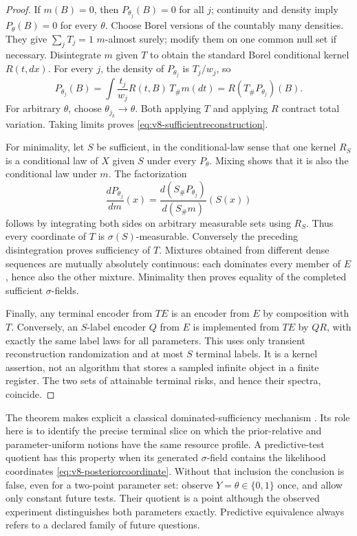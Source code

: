 \begin{proof}
If $m(B)=0$, then $P_{\theta_j}(B)=0$ for all $j$; continuity and density
imply $P_\theta(B)=0$ for every $\theta$. Choose Borel versions of the
countably many densities. They give $\sum_jT_j=1$ $m$-almost surely;
modify them on one common null set if necessary. Disintegrate $m$ given
$T$ to obtain the standard Borel conditional kernel $R(t,dx)$.
For every $j$, the density of $P_{\theta_j}$ is $T_j/w_j$, so
\[
 P_{\theta_j}(B)=\int \frac{t_j}{w_j}R(t,B)\,T_\#m(dt)
               =R(T_\#P_{\theta_j})(B).
\]
For arbitrary $\theta$, choose $\theta_{j_k}\to\theta$. Both applying
$T$ and applying $R$ contract total variation. Taking limits proves
\eqref{eq:v8-sufficientreconstruction}.

For minimality, let $S$ be sufficient, in the conditional-law sense that
one kernel $R_S$ is a conditional law of $X$ given $S$ under every
$P_\theta$. Mixing shows that it is also the conditional law under $m$.
The factorization
\[
 \frac{dP_{\theta_j}}{dm}(x)
 =\frac{d(S_\#P_{\theta_j})}{d(S_\#m)}(S(x))
\]
follows by integrating both sides on arbitrary measurable sets using
$R_S$. Thus every coordinate of $T$ is $\sigma(S)$-measurable.
Conversely the preceding disintegration proves sufficiency of $T$.
Mixtures obtained from different dense sequences are mutually absolutely
continuous: each dominates every member of $E$, hence also the other
mixture. Minimality then proves equality of the completed sufficient
$\sigma$-fields.

Finally, any terminal encoder from $TE$ is an encoder from $E$ by
composition with $T$. Conversely, an $S$-label encoder $Q$ from $E$ is
implemented from $TE$ by $QR$, with exactly the same label laws for all
parameters. This uses only transient reconstruction randomization and
at most $S$ terminal labels. It is a kernel assertion, not an algorithm
that stores a sampled infinite object in a finite register. The two
sets of attainable terminal risks, and hence their spectra, coincide.
\end{proof}

The theorem makes explicit a classical dominated-sufficiency mechanism
\cite{LeCam1964,Torgersen1991}. Its role here is to identify the precise
terminal slice on which the prior-relative and parameter-uniform notions
have the same resource profile. A predictive-test quotient has this
property when its generated $\sigma$-field contains the likelihood
coordinates \eqref{eq:v8-posteriorcoordinate}. Without that inclusion the
conclusion is false, even for a two-point parameter set: observe
$Y=\theta\in\{0,1\}$ once, and allow only constant future tests. Their
quotient is a point although the observed experiment distinguishes both
parameters exactly. Predictive equivalence always refers to a declared
family of future questions.

